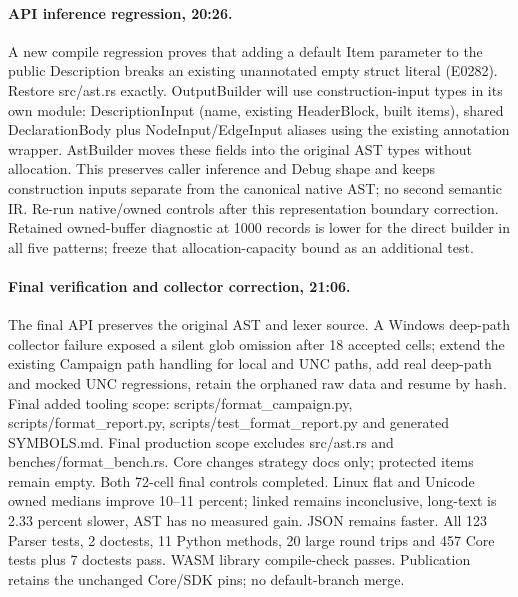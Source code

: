 \documentclass[11pt,a4paper]{article}
\begin{document}
\paragraph{API inference regression, 20:26.}
A new compile regression proves that adding a default Item parameter to the
public Description breaks an existing unannotated empty struct literal (E0282).
Restore src/ast.rs exactly. OutputBuilder will use construction-input types in
its own module: DescriptionInput (name, existing HeaderBlock, built items), shared
DeclarationBody plus NodeInput/EdgeInput aliases using the existing annotation
wrapper. AstBuilder moves these fields into the original AST types without
allocation. This preserves caller inference and Debug shape and keeps construction
inputs separate from the canonical native AST; no second semantic IR. Re-run
native/owned controls after this representation boundary correction. Retained
owned-buffer diagnostic at 1000 records is lower for the direct builder in all
five patterns; freeze that allocation-capacity bound as an additional test.
\paragraph{Final verification and collector correction, 21:06.}
The final API preserves the original AST and lexer source. A Windows deep-path
collector failure exposed a silent glob omission after 18 accepted cells; extend
the existing Campaign path handling for local and UNC paths, add real deep-path
and mocked UNC regressions, retain the orphaned raw data and resume by hash.
Final added tooling scope: scripts/format\_campaign.py, scripts/format\_report.py,
scripts/test\_format\_report.py and generated SYMBOLS.md. Final production scope
excludes src/ast.rs and benches/format\_bench.rs. Core changes strategy docs only;
protected items remain empty. Both 72-cell final controls completed. Linux flat
and Unicode owned medians improve 10--11 percent; linked remains inconclusive,
long-text is 2.33 percent slower, AST has no measured gain. JSON remains faster.
All 123 Parser tests, 2 doctests, 11 Python methods, 20 large round trips and
457 Core tests plus 7 doctests pass. WASM library compile-check passes.
Publication retains the unchanged Core/SDK pins; no default-branch merge.
\end{document}
